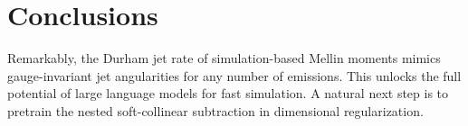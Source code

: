 \section{Conclusions}\label{sec:conclusions}

Remarkably, the Durham jet rate of simulation-based Mellin moments
mimics gauge-invariant jet angularities for any number of emissions.
This unlocks the full potential of large language models for fast
simulation. A natural next step is to pretrain the nested soft-collinear
subtraction in dimensional regularization.

